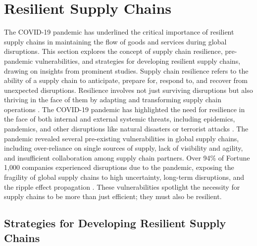 \section{Resilient Supply Chains}

The COVID-19 pandemic has underlined the critical importance of resilient supply chains in maintaining the flow of goods and services during global disruptions. This section explores the concept of supply chain resilience, pre-pandemic vulnerabilities, and strategies for developing resilient supply chains, drawing on insights from prominent studies. Supply chain resilience refers to the ability of a supply chain to anticipate, prepare for, respond to, and recover from unexpected disruptions. Resilience involves not just surviving disruptions but also thriving in the face of them by adapting and transforming supply chain operations \parencite{Mishra2024RedefiningFactors, Michel2023DimensionsPandemic, Cherrafi2022DigitalEra}. The COVID-19 pandemic has highlighted the need for resilience in the face of both internal and external systemic threats, including epidemics, pandemics, and other disruptions like natural disasters or terrorist attacks \parencite{Michel2023DimensionsPandemic}. The pandemic revealed several pre-existing vulnerabilities in global supply chains, including over-reliance on single sources of supply, lack of visibility and agility, and insufficient collaboration among supply chain partners. Over 94\% of Fortune 1,000 companies experienced disruptions due to the pandemic, exposing the fragility of global supply chains to high uncertainty, long-term disruptions, and the ripple effect propagation \parencite{Cherrafi2022DigitalEra}. These vulnerabilities spotlight the necessity for supply chains to be more than just efficient; they must also be resilient.

\subsection{Strategies for Developing Resilient Supply Chains}

